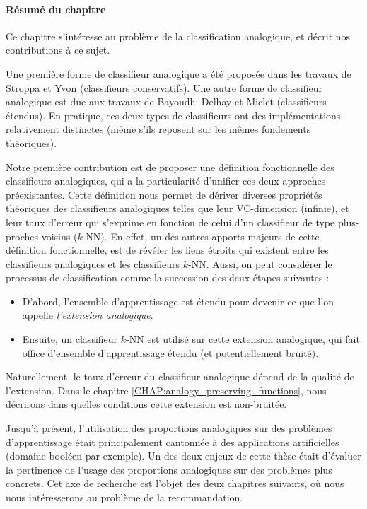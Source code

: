 \paragraph{Résumé du chapitre}
Ce chapitre s'intéresse au problème de la classification analogique, et décrit
nos contributions à ce sujet.

Une première forme de classifieur analogique a été proposée dans les travaux
de Stroppa et Yvon  \cite{StrYvoCNLL05} (classifieurs conservatifs). Une autre
forme de classifieur analogique est due aux travaux de Bayoudh, Delhay et
Miclet \cite{MicBayDelJAIR08, BayMicDelIJCAI07} (classifieurs étendus).
En pratique, ces deux types de classifieurs ont des implémentations
relativement distinctes (même s'ils reposent sur les mêmes fondements
théoriques).

Notre première contribution est de proposer une définition fonctionnelle des
classifieurs analogiques, qui a la particularité d'unifier ces deux approches
préexistantes. Cette définition nous permet de dériver diverses propriétés
théoriques des classifieurs analogiques telles que leur VC-dimension (infinie),
et leur taux d'erreur qui s'exprime en fonction de celui d'un classifieur de
type plus-proches-voisins ($k$-NN). En effet, un des autres apports majeurs de
cette définition fonctionnelle, est de révéler les liens étroits qui existent
entre les classifieurs analogiques et les classifieurs $k$-NN. Aussi, on peut
considérer le processus de classification comme la succession des deux étapes
suivantes :

\begin{itemize}
  \item D'abord, l'ensemble d'apprentissage est étendu pour devenir ce que l'on
    appelle \textit{l'extension analogique}.
  \item Ensuite, un classifieur $k$-NN est utilisé sur cette extension
    analogique, qui fait office d'ensemble d'apprentissage étendu (et
    potentiellement bruité).
\end{itemize}

Naturellement, le taux d'erreur du classifieur analogique dépend de la qualité
de l'extension. Dans le chapitre \ref{CHAP:analogy_preserving_functions}, nous
décrirons dans quelles conditions cette extension est non-bruitée.


Jusqu'à présent, l'utilisation des proportions analogiques sur des problèmes
d'apprentissage était principalement cantonnée à des applications artificielles
(domaine booléen par exemple). Un des deux enjeux de cette thèse était
d'évaluer la pertinence de l'usage des proportions analogiques sur des
problèmes plus concrets. Cet axe de recherche est l'objet des deux chapitres
suivants, où nous nous intéresserons au problème de la recommandation.
